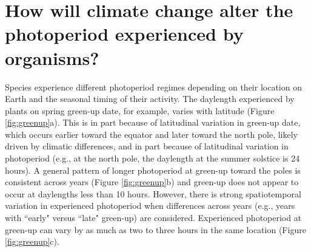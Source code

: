 \documentclass{article}
\begin{document}
\section*{How will climate change alter the photoperiod experienced by organisms?}
\par Species experience different photoperiod regimes depending on their location on Earth and the seasonal timing of their activity. The daylength experienced by plants on spring green-up date, for example, varies with latitude (Figure \ref{fig:greenup}a). This is in part because of latitudinal variation in green-up date, which occurs earlier toward the equator and later toward the north pole, likely driven by climatic differences, and in part because of latitudinal variation in photoperiod (e.g., at the north pole, the daylength at the summer solstice is 24 hours). A general pattern of longer photoperiod at green-up toward the poles is consistent across years (Figure \ref{fig:greenup}b) and green-up does not appear to occur at daylengths less than 10 hours. However, there is strong spatiotemporal variation in experienced photoperiod when differences across years (e.g., years with ``early" versus ``late" green-up) are considered. Experienced photoperiod at green-up can vary by as much as two to three hours in the same location (Figure \ref{fig:greenup}c).
\end{document}
